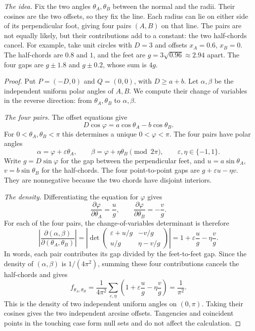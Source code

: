 \documentclass[11pt]{amsart}
\theoremstyle{remark}
\begin{document}
\emph{The idea.} Fix the two angles $\theta_A,\theta_B$ between the normal and the radii. Their cosines are the two offsets, so they fix the line. Each radius can lie on either side of its perpendicular foot, giving four pairs $(A,B)$ on that line. The pairs are not equally likely, but their contributions add to a constant: the two half-chords cancel. For example, take unit circles with $D=3$ and offsets $x_A=0.6$, $x_B=0$. The half-chords are $0.8$ and $1$, and the feet are $g=3\sqrt{0.96}\approx2.94$ apart. The four gaps are $g\pm1.8$ and $g\pm0.2$, whose sum is $4g$.

\begin{proof}
Put $P=(-D,0)$ and $Q=(0,0)$, with $D\ge a+b$. Let $\alpha,\beta$ be the independent uniform polar angles of $A,B$. We compute their change of variables in the reverse direction: from $\theta_A,\theta_B$ to $\alpha,\beta$.

\emph{The four pairs.} The offset equations give
\[
D\cos\varphi=a\cos\theta_A-b\cos\theta_B.
\]
For $0<\theta_A,\theta_B<\pi$ this determines a unique $0<\varphi<\pi$. The four pairs have polar angles
\[
\alpha=\varphi+\varepsilon\theta_A,\qquad
\beta=\varphi+\eta\theta_B \pmod{2\pi},\qquad \varepsilon,\eta\in\{-1,1\}.
\]
Write $g=D\sin\varphi$ for the gap between the perpendicular feet, and $u=a\sin\theta_A$, $v=b\sin\theta_B$ for the half-chords. The four point-to-point gaps are $g+\varepsilon u-\eta v$. They are nonnegative because the two chords have disjoint interiors.

\emph{The density.} Differentiating the equation for $\varphi$ gives
\[
\frac{\partial\varphi}{\partial\theta_A}=\frac{u}{g},\qquad
\frac{\partial\varphi}{\partial\theta_B}=-\frac{v}{g}.
\]
For each of the four pairs, the change-of-variables determinant is therefore
\[
\left|\frac{\partial(\alpha,\beta)}{\partial(\theta_A,\theta_B)}\right|
=\left|\det\begin{pmatrix}
\varepsilon+u/g&-v/g\\ u/g&\eta-v/g
\end{pmatrix}\right|
=1+\varepsilon\frac{u}{g}-\eta\frac{v}{g}.
\]
In words, each pair contributes its gap divided by the feet-to-feet gap. Since the density of $(\alpha,\beta)$ is $1/(4\pi^2)$, summing these four contributions cancels the half-chords and gives
\[
f_{\theta_A,\theta_B}=\frac{1}{4\pi^2}
\sum_{\varepsilon,\eta}\left(1+\varepsilon\frac{u}{g}-\eta\frac{v}{g}\right)
=\frac{1}{\pi^2}.
\]
This is the density of two independent uniform angles on $(0,\pi)$. Taking their cosines gives the two independent arcsine offsets. Tangencies and coincident points in the touching case form null sets and do not affect the calculation.
\end{proof}
\end{document}
